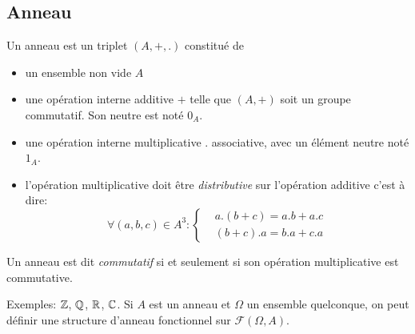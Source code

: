 \subsection{Anneau}
\begin{defi}
  Un anneau est un triplet $(A,+,.)$ constitué de
\begin{itemize}
  \item un ensemble non vide $A$
  \item une opération interne additive $+$ telle que $(A,+)$ soit un groupe commutatif. Son neutre est noté $0_A$.
  \item une opération interne multiplicative $.$ associative, avec un élément neutre noté $1_A$.
  \item l'opération multiplicative doit être \emph{distributive} sur l'opération additive c'est à dire:
\begin{displaymath}
\forall (a,b,c)\in A^3:
\left\lbrace 
\begin{aligned}
  &a.(b+c) = a.b +a.c \\ &(b+c).a = b.a + c.a
\end{aligned}
\right. 
\end{displaymath}
\end{itemize}
\end{defi}
\begin{defi}
  Un anneau est dit \emph{commutatif} si et seulement si son opération multiplicative est commutative.
\end{defi}
Exemples: $\mathbb{Z}$, $\mathbb{Q}$, $\mathbb{R}$, $\mathbb{C}$. Si $A$ est un anneau et $\Omega$ un ensemble quelconque, on peut définir une structure d'anneau fonctionnel sur $\mathcal{F}(\Omega,A)$. 

